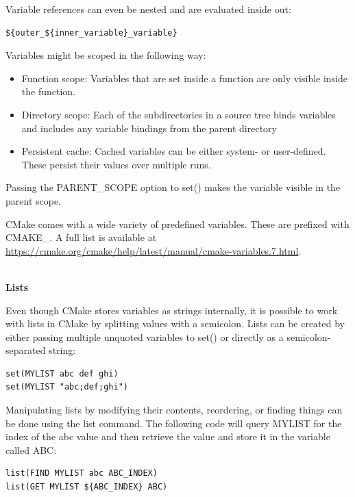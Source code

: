Variable references can even be nested and are evaluated inside out:

\begin{lstlisting}[style=styleCMake]
${outer_${inner_variable}_variable}
\end{lstlisting}

Variables might be scoped in the following way:

\begin{itemize}
\item 
Function scope: Variables that are set inside a function are only visible inside the function.

\item 
Directory scope: Each of the subdirectories in a source tree binds variables and includes any variable bindings from the parent directory

\item 
Persistent cache: Cached variables can be either system- or user-defined. These persist their values over multiple runs.
\end{itemize}

Passing the PARENT\_SCOPE option to set() makes the variable visible in the parent scope.

CMake comes with a wide variety of predefined variables. These are prefixed with CMAKE\_. A full list is available at \url{https://cmake.org/cmake/help/latest/manual/cmake-variables.7.html}.


\hspace*{\fill} \\ %
\noindent
\textbf{Lists}

Even though CMake stores variables as strings internally, it is possible to work with lists in CMake by splitting values with a semicolon. Lists can be created by either passing multiple unquoted variables to set() or directly as a semicolon-separated string:

\begin{lstlisting}[style=styleCMake]
set(MYLIST abc def ghi)
set(MYLIST "abc;def;ghi")
\end{lstlisting}

Manipulating lists by modifying their contents, reordering, or finding things can be done using the list command. The following code will query MYLIST for the index of the abc value and then retrieve the value and store it in the variable called ABC:

\begin{lstlisting}[style=styleCMake]
list(FIND MYLIST abc ABC_INDEX)
list(GET MYLIST ${ABC_INDEX} ABC)
\end{lstlisting}

